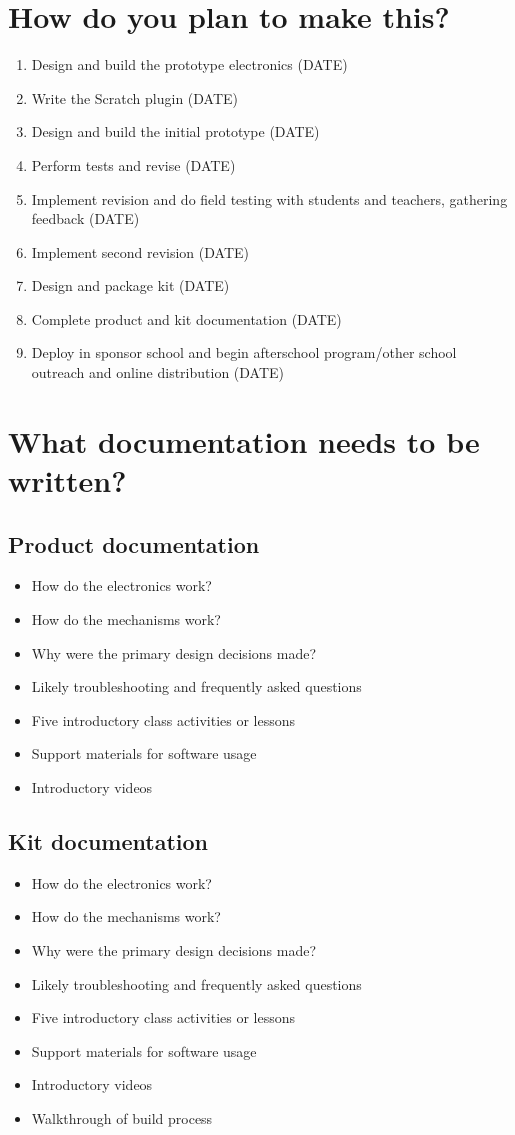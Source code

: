 \documentclass[11pt]{article}
\begin{document}
\section{How do you plan to make this?}
\begin{enumerate}
\item Design and build the prototype electronics (DATE)
\item Write the Scratch plugin (DATE)
\item Design and build the initial prototype (DATE)
\item Perform tests and revise (DATE)
\item Implement revision and do field testing with students and teachers, gathering feedback (DATE)
\item Implement second revision (DATE)
\item Design and package kit (DATE)
\item Complete product and kit documentation (DATE)
\item Deploy in sponsor school and begin afterschool program/other school outreach and online distribution (DATE)
\end{enumerate}

\section{What documentation needs to be written?}
\subsection{Product documentation}
\begin{itemize}
\item How do the electronics work?
\item How do the mechanisms work?
\item Why were the primary design decisions made?
\item Likely troubleshooting and frequently asked questions
\item Five introductory class activities or lessons
\item Support materials for software usage
\item Introductory videos
\end{itemize}

\subsection{Kit documentation}
\begin{itemize}
\item How do the electronics work?
\item How do the mechanisms work?
\item Why were the primary design decisions made?
\item Likely troubleshooting and frequently asked questions
\item Five introductory class activities or lessons
\item Support materials for software usage
\item Introductory videos
\item Walkthrough of build process
\end{itemize}
\end{document}
